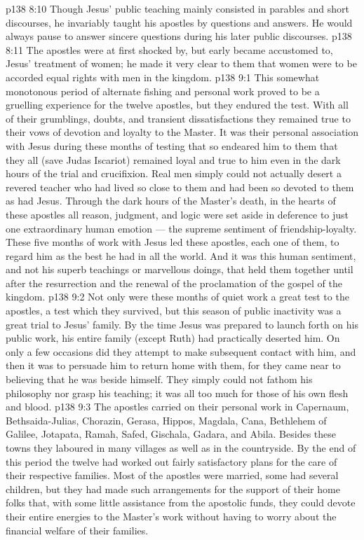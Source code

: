\vs p138 8:10 \pc Though Jesus’ public teaching mainly consisted in parables and short discourses, he invariably taught his apostles by questions and answers. He would always pause to answer sincere questions during his later public discourses.
\vs p138 8:11 The apostles were at first shocked by, but early became accustomed to, Jesus’ treatment of women; he made it very clear to them that women were to be accorded equal rights with men in the kingdom.
\vs p138 9:1 This somewhat monotonous period of alternate fishing and personal work proved to be a gruelling experience for the twelve apostles, but they endured the test. With all of their grumblings, doubts, and transient dissatisfactions they remained true to their vows of devotion and loyalty to the Master. It was their personal association with Jesus during these months of testing that so endeared him to them that they all (save Judas Iscariot) remained loyal and true to him even in the dark hours of the trial and crucifixion. Real men simply could not actually desert a revered teacher who had lived so close to them and had been so devoted to them as had Jesus. Through the dark hours of the Master’s death, in the hearts of these apostles all reason, judgment, and logic were set aside in deference to just one extraordinary human emotion --- the supreme sentiment of friendship\hyp{}loyalty. These five months of work with Jesus led these apostles, each one of them, to regard him as the best  he had in all the world. And it was this human sentiment, and not his superb teachings or marvellous doings, that held them together until after the resurrection and the renewal of the proclamation of the gospel of the kingdom.
\vs p138 9:2 Not only were these months of quiet work a great test to the apostles, a test which they survived, but this season of public inactivity was a great trial to Jesus’ family. By the time Jesus was prepared to launch forth on his public work, his entire family (except Ruth) had practically deserted him. On only a few occasions did they attempt to make subsequent contact with him, and then it was to persuade him to return home with them, for they came near to believing that he was beside himself. They simply could not fathom his philosophy nor grasp his teaching; it was all too much for those of his own flesh and blood.
\vs p138 9:3 \pc The apostles carried on their personal work in Capernaum, Bethsaida\hyp{}Julias, Chorazin, Gerasa, Hippos, Magdala, Cana, Bethlehem of Galilee, Jotapata, Ramah, Safed, Gischala, Gadara, and Abila. Besides these towns they laboured in many villages as well as in the countryside. By the end of this period the twelve had worked out fairly satisfactory plans for the care of their respective families. Most of the apostles were married, some had several children, but they had made such arrangements for the support of their home folks that, with some little assistance from the apostolic funds, they could devote their entire energies to the Master’s work without having to worry about the financial welfare of their families.
